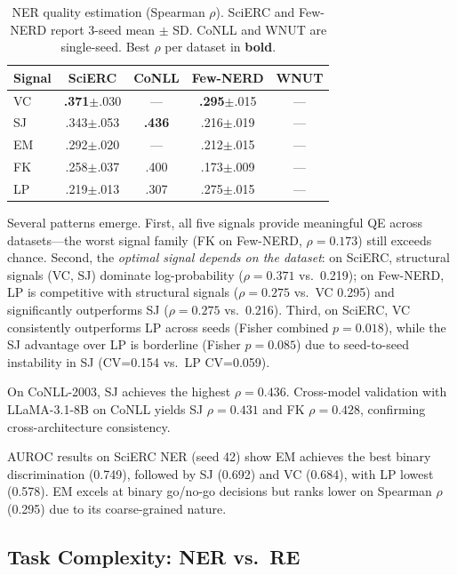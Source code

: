 \documentclass[11pt,a4paper]{article}
\begin{document}
\begin{table}[t]
\centering
\small
\caption{NER quality estimation (Spearman $\rho$). SciERC and Few-NERD report 3-seed mean $\pm$ SD. CoNLL and WNUT are single-seed. Best $\rho$ per dataset in \textbf{bold}.}
\label{tab:ner_qe}
\begin{tabular}{lcccc}
\toprule
\textbf{Signal} & \textbf{SciERC} & \textbf{CoNLL} & \textbf{Few-NERD} & \textbf{WNUT} \\
\midrule
VC   & \textbf{.371}{\scriptsize$\pm$.030} & ---   & \textbf{.295}{\scriptsize$\pm$.015} & --- \\
SJ   & .343{\scriptsize$\pm$.053} & \textbf{.436} & .216{\scriptsize$\pm$.019} & --- \\
EM   & .292{\scriptsize$\pm$.020} & ---   & .212{\scriptsize$\pm$.015} & --- \\
FK   & .258{\scriptsize$\pm$.037} & .400  & .173{\scriptsize$\pm$.009} & --- \\
LP   & .219{\scriptsize$\pm$.013} & .307  & .275{\scriptsize$\pm$.015} & --- \\
\bottomrule
\end{tabular}
\end{table}

Several patterns emerge.
First, all five signals provide meaningful QE across datasets---the worst signal family (FK on Few-NERD, $\rho{=}0.173$) still exceeds chance.
Second, the \emph{optimal signal depends on the dataset}: on SciERC, structural signals (VC, SJ) dominate log-probability ($\rho{=}0.371$ vs.\ 0.219); on Few-NERD, LP is competitive with structural signals ($\rho{=}0.275$ vs.\ VC 0.295) and significantly outperforms SJ ($\rho{=}0.275$ vs.\ 0.216).
Third, on SciERC, VC consistently outperforms LP across seeds (Fisher combined $p{=}0.018$), while the SJ advantage over LP is borderline (Fisher $p{=}0.085$) due to seed-to-seed instability in SJ (CV=0.154 vs.\ LP CV=0.059).

On CoNLL-2003, SJ achieves the highest $\rho{=}0.436$.
Cross-model validation with LLaMA-3.1-8B on CoNLL yields SJ $\rho{=}0.431$ and FK $\rho{=}0.428$, confirming cross-architecture consistency.

AUROC results on SciERC NER (seed 42) show EM achieves the best binary discrimination (0.749), followed by SJ (0.692) and VC (0.684), with LP lowest (0.578). EM excels at binary go/no-go decisions but ranks lower on Spearman $\rho$ (0.295) due to its coarse-grained nature.

\subsection{Task Complexity: NER vs.\ RE}
\end{document}
